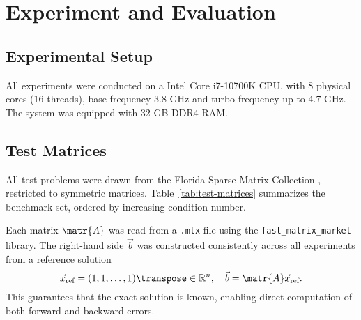 \chapter{Experiment and Evaluation}
\label{cha:exper-eval}

\section{Experimental Setup}
\label{sec:experimental-setup}

All experiments were conducted on a Intel\textsuperscript{\textregistered}
Core\textsuperscript{\texttrademark} i7-10700K CPU, with 8 physical cores (16
threads), base frequency 3.8 GHz and turbo frequency up to 4.7 GHz. The system
was equipped with 32 GB DDR4 RAM.

\section{Test Matrices}
\label{sec:test-matrices}

All test problems were drawn from the Florida Sparse Matrix Collection
\cite{davis_university_2011}, restricted to symmetric matrices.
Table~\ref{tab:test-matrices} summarizes the benchmark set, ordered by
increasing condition number.

Each matrix \(\matr{A}\) was read from a \texttt{.mtx} file using the
\texttt{fast\_matrix\_market} \cite{alistair_lugowski_fast_matrix_market_2023}
library. The right-hand side \(\vec{b}\) was constructed consistently across all
experiments from a reference solution \[\vec{x}_{\text{ref}} = (1, 1, \dots,
  1)\transpose \in \mathbb{R}^{n}, \quad \vec{b} =
  \matr{A}\vec{x}_{\text{ref}}.\] This guarantees that the exact solution is
known, enabling direct computation of both forward and backward errors.

